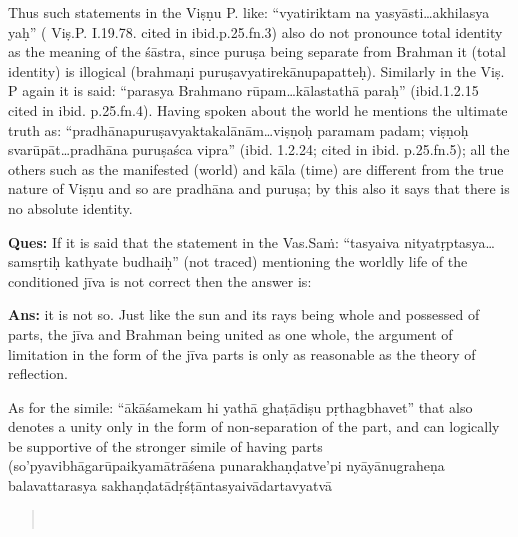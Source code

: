 Thus such statements in the Viṣṇu P. like: “vyatiriktam na yasyāsti…akhilasya yaḥ” ( Viṣ.P. I.19.78. cited in ibid.p.25.fn.3) also do not pronounce total identity as the meaning of the śāstra, since puruṣa being separate from Brahman it (total identity) is illogical (brahmaṇi puruṣavyatirekānupapatteḥ). Similarly in the Viṣ. P again it is said: “parasya Brahmano rūpam…kālastathā paraḥ” (ibid.1.2.15 cited in ibid. p.25.fn.4). Having spoken about the world he mentions the ultimate truth as: “pradhānapuruṣavyaktakalānām…viṣṇoḥ paramam padam; viṣṇoḥ svarūpāt…pradhāna puruṣaśca vipra” (ibid. 1.2.24; cited in ibid. p.25.fn.5); all the others such as the manifested (world) and kāla (time) are different from the true nature of Viṣṇu and so are pradhāna and puruṣa; by this also it says that there is no absolute identity. 

\textbf{Ques:} If it is said that the statement in the Vas.Saṁ: “tasyaiva nityatṛptasya…samsṛtiḥ kathyate budhaiḥ” (not traced) mentioning the worldly life of the conditioned jīva is not correct then the answer is: 

\textbf{Ans:} it is not so. Just like the sun and its rays being whole and possessed of parts, the jīva and Brahman being united as one whole, the argument of limitation in the form of the jīva parts is only as reasonable as the theory of reflection.

As for the simile: “ākāśamekam hi yathā ghaṭādiṣu pṛthagbhavet” that also denotes a unity only in the form of non-separation of the part, and can logically be supportive of the stronger simile of having parts (so’pyavibhāgarūpaikyamātrāśena punarakhaṇḍatve’pi nyāyānugra\-heṇa balavattarasya sakhaṇḍatādṛśṭāntasyaivādartavyatvā

\begin{verse}
\\
\end{verse}


